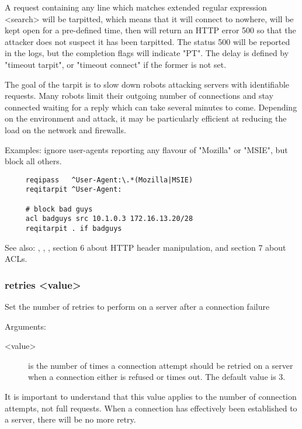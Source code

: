   A request containing any line which matches extended regular expression
  <search> will be tarpitted, which means that it will connect to nowhere, will
  be kept open for a pre-defined time, then will return an HTTP error 500 so
  that the attacker does not suspect it has been tarpitted. The status 500 will
  be reported in the logs, but the completion flags will indicate "PT". The
  delay is defined by "timeout tarpit", or "timeout connect" if the former is
  not set.

  The goal of the tarpit is to slow down robots attacking servers with
  identifiable requests. Many robots limit their outgoing number of connections
  and stay connected waiting for a reply which can take several minutes to
  come. Depending on the environment and attack, it may be particularly
  efficient at reducing the load on the network and firewalls.

  Examples: ignore user-agents reporting any flavour of "Mozilla" or "MSIE", but block all others.
  \begin{verbatim}
     reqipass   ^User-Agent:\.*(Mozilla|MSIE)
     reqitarpit ^User-Agent:

     # block bad guys
     acl badguys src 10.1.0.3 172.16.13.20/28
     reqitarpit . if badguys
  \end{verbatim}

  See also: , , , section 6 about HTTP header
            manipulation, and section 7 about ACLs.

\subsubsection[retries]{retries <value>}


  Set the number of retries to perform on a server after a connection failure


  Arguments:
  \begin{description}
  \item[<value>] is the number of times a connection attempt should be retried on
              a server when a connection either is refused or times out. The
              default value is 3.
  \end{description}
  
  It is important to understand that this value applies to the number of
  connection attempts, not full requests. When a connection has effectively
  been established to a server, there will be no more retry.

